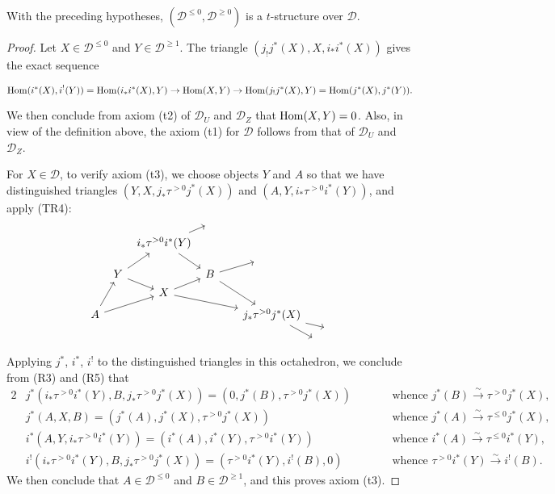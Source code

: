 \begin{theorem}\label{triangle car recollement theorem}
With the preceding hypotheses, $(\mathcal{D}^{\leq 0},\mathcal{D}^{\geq 0})$ is a $t$-structure over $\mathcal{D}$.
\end{theorem}
\begin{proof}
Let $X\in\mathcal{D}^{\leq 0}$ and $Y\in\mathcal{D}^{\geq 1}$. The triangle $(j_!j^*(X),X,i_*i^*(X))$ gives the exact sequence
\begin{small}
\[\mathrm{Hom}(i^*(X),i^!(Y))=\mathrm{Hom}(i_*i^*(X),Y)\to \mathrm{Hom}(X,Y)\to\mathrm{Hom}(j_!j^*(X),Y)=\mathrm{Hom}(j^*(X),j^*(Y)).\]
\end{small}
We then conclude from axiom (t2) of $\mathcal{D}_U$ and $\mathcal{D}_Z$ that $\mathrm{Hom}(X,Y)=0$. Also, in view of the definition above, the axiom (t1) for $\mathcal{D}$ follows from that of $\mathcal{D}_U$ and $\mathcal{D}_Z$.\par
For $X\in\mathcal{D}$, to verify axiom (t3), we choose objects $Y$ and $A$ so that we have distinguished triangles $(Y,X,j_*\tau^{>0}j^*(X))$ and $(A,Y,i_*\tau^{>0}i^*(Y))$, and apply (TR4):
\vspace*{-2mm}
\begin{equation*}
\begin{tikzcd}[row sep=2pt,column sep=4pt]
&&&{}&\\
&&i_*\tau^{>0}i^*(Y)\ar[ru]\ar[rdd]&&\\
&&&{}&{}&{\hspace*{8mm}}\\
&Y\ar[rd]\ar[ruu]&&B\ar[rru]\ar[rrddd]\\
&&X\ar[ru]\ar[rrrdd]&&\\
&&&&\\
A\ar[ruuu]\ar[rruu]&&&&&j_*\tau^{>0}j^*(X)\ar[rdd]\ar[rrd]\\
&&&&&&&{}\\
&&&&&&{}&
\end{tikzcd}
\vspace*{-3mm}
\end{equation*}
Applying $j^*$, $i^*$, $i^!$ to the distinguished triangles in this octahedron, we conclude from (R3) and (R5) that
\begin{alignat*}{2}
&j^*(i_*\tau^{>0}i^*(Y),B,j_*\tau^{>0}j^*(X))=(0,j^*(B),\tau^{>0}j^*(X))&\quad\quad&\text{whence $j^*(B)\stackrel{\sim}{\to} \tau^{>0}j^*(X)$},\\
&j^*(A,X,B)=(j^*(A),j^*(X),\tau^{>0}j^*(X))&\quad\quad&\text{whence $j^*(A)\stackrel{\sim}{\to} \tau^{\leq 0}j^*(X)$},\\
&i^*(A,Y,i_*\tau^{>0}i^*(Y))=(i^*(A),i^*(Y),\tau^{>0}i^*(Y))&\quad\quad&\text{whence $i^*(A)\stackrel{\sim}{\to} \tau^{\leq 0}i^*(Y)$},\\
&i^!(i_*\tau^{>0}i^*(Y),B,j_*\tau^{>0}j^*(X))=(\tau^{>0}i^*(Y),i^!(B),0)&\quad\quad&\text{whence $\tau^{>0}i^*(Y)\stackrel{\sim}{\to} i^!(B)$}.
\end{alignat*}
We then conclude that $A\in\mathcal{D}^{\leq 0}$ and $B\in\mathcal{D}^{\geq 1}$, and this proves axiom (t3).
\end{proof}

